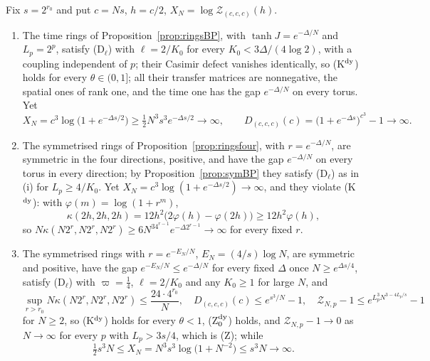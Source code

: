 \begin{proposition}
\label{prop:pressrings}
Fix $s=2^{r_0}$ and put $c=Ns$, $h=c/2$, $X_N=\log\mathcal Z_{(c,c,c)}(h)$.
\begin{enumerate}[label=\textup{(\roman*)},leftmargin=*]
\item The time rings of Proposition~\ref{prop:ringsBP}, with $\tanh J=e^{-
\Delta/N}$ and $L_p=2^p$, satisfy \textup{(D$_\ell$)} with $\ell=2/K_0$ for
every $K_0<3\Delta/(4\log2)$, with a coupling independent of $p$; their
Casimir defect vanishes identically, so \textup{(K$^{\rm dy}$)} holds for
every $\theta\in(0,1]$; all their transfer matrices are nonnegative, the
spatial ones of rank one, and the time one has the gap $e^{-\Delta/N}$ on
every torus. Yet
\[
X_N=c^3\log\bigl(1+e^{-\Delta s/2}\bigr)\ge\tfrac12N^3s^3e^{-\Delta s/2}\to
\infty,\qquad D_{(c,c,c)}(c)=\bigl(1+e^{-\Delta s}\bigr)^{c^3}-1\to\infty .
\]
\item The symmetrised rings of Proposition~\ref{prop:ringsfour}, with $r=e^{-
\Delta/N}$, are symmetric in the four directions, positive, and have the gap
$e^{-\Delta/N}$ on every torus in every direction; by
Proposition~\ref{prop:symBP} they satisfy \textup{(D$_\ell$)} as in \textup{(i)}
for $L_p\ge4/K_0$. Yet $X_N=c^3\log(1+e^{-\Delta s/2})\to\infty$, and they
violate \textup{(K$^{\rm dy}$)}: with $\varphi(m)=\log(1+r^m)$,
\[
\kappa(2h,2h,2h)=12h^2\bigl(2\varphi(h)-\varphi(2h)\bigr)\ge12h^2\varphi(h),
\]
so $N\kappa(N2^r,N2^r,N2^r)\ge6N^34^{r-1}e^{-\Delta2^{r-1}}\to\infty$ for every
fixed $r$.
\item The symmetrised rings with $r=e^{-E_N/N}$, $E_N=(4/s)\log N$, are
symmetric and positive, have the gap $e^{-E_N/N}\le e^{-\Delta/N}$ for every
fixed $\Delta$ once $N\ge e^{\Delta s/4}$, satisfy \textup{(D$_\ell$)} with
$\varpi=\frac14$, $\ell=2/K_0$ and any $K_0\ge1$ for large $N$, and
\[
\sup_{r>r_0}N\kappa(N2^r,N2^r,N2^r)\le\frac{24\cdot4^{r_0}}N,\quad
D_{(c,c,c)}(c)\le e^{s^3/N}-1,\quad\mathcal Z_{N,p}-1\le e^{L_p^3N^{3-4L_p/s}}-1
\]
for $N\ge2$, so \textup{(K$^{\rm dy}$)} holds for every $\theta<1$,
\textup{(Z$_0^{\rm dy}$)} holds, and $\mathcal Z_{N,p}-1\to0$ as $N\to\infty$
for every $p$ with $L_p>3s/4$, which is \textup{(Z)}; while
\[
\tfrac12s^3N\le X_N=N^3s^3\log\bigl(1+N^{-2}\bigr)\le s^3N\to\infty .
\]
\end{enumerate}
\end{proposition}

